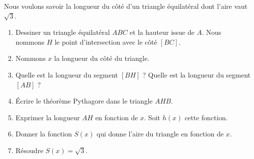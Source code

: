 
\begin{exercice}\label{exoSeconde-0063}

    Nous voulons savoir la longueur du côté d'un triangle équilatéral dont l'aire vaut \( \sqrt{3}\).
    \begin{enumerate}
        \item
            Dessiner un triangle équilatéral \( ABC\) et la hauteur issue de \( A\). Nous nommons \( H\) le point d'intersection avec le côté \( [BC]\).
        \item
            Nommons \( x\) la longueur du côté du triangle.
        \item
            Quelle est la longueur du segment \( [BH]\) ? Quelle est la longueur du segment \( [AB]\) ?
        \item
            Écrire le théorème Pythagore dans le triangle \( AHB\).
        \item
            Exprimer la longueur \( AH\) en fonction de \( x\). Soit \( h(x)\) cette fonction.
        \item
            Donner la fonction \( S(x)\) qui donne l'aire du triangle en fonction de \( x\).
        \item
            Résoudre \( S(x)=\sqrt{3}\).
    \end{enumerate}

\end{exercice}
